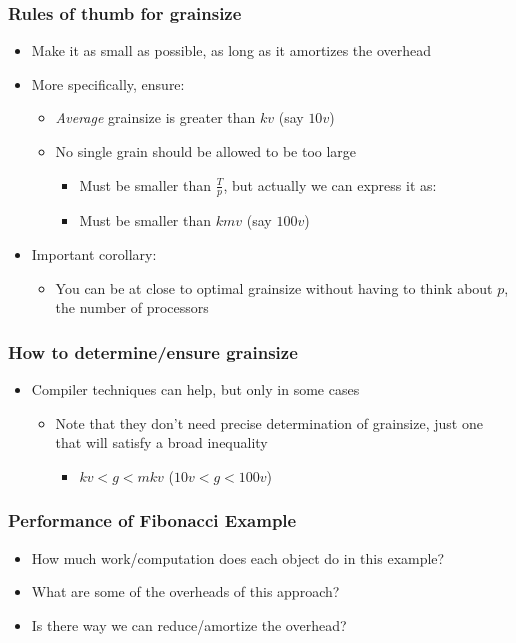 \begin{frame}
  \frametitle{Rules of thumb for grainsize}
  \begin{itemize}
    \item Make it as small as possible, as long as it amortizes the overhead
    \item More specifically, ensure:
      \begin{itemize}
      \item \textit{Average} grainsize is greater than $kv$ (say $10v$)
      \item No single grain should be allowed to be too large 
        \begin{itemize}
          \item Must be smaller than $\frac{T}{p}$, but actually we can express
            it as:
          \item Must be smaller than $kmv$ (say $100v$)
        \end{itemize}
      \end{itemize}
    \item Important corollary:
      \begin{itemize}
      \item You can be at close to optimal grainsize without having to think
        about $p$, the number of processors
      \end{itemize}
  \end{itemize}
\end{frame}

\begin{frame}
  \frametitle{How to determine/ensure grainsize}
  \begin{itemize}
    \item Compiler techniques can help, but only in some cases
      \begin{itemize}
        \item Note that they don't need precise determination of grainsize,
          just one that will satisfy a broad inequality
          \begin{itemize}
            \item $kv < g < mkv$ ($10v < g < 100v$)
          \end{itemize}
      \end{itemize}
  \end{itemize}
\end{frame}

\begin{frame}[fragile]
  \frametitle{Performance of Fibonacci Example}
  \begin{itemize}
  \item How much work/computation does each object do in this example?
  \item What are some of the overheads of this approach?
  \item Is there way we can reduce/amortize the overhead?
  \end{itemize}
\end{frame}

